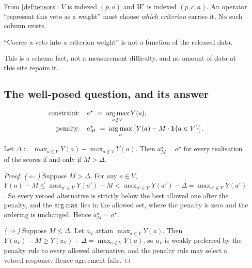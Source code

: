 From \cref{def:tensors}: $V$ is indexed $(p,a)$ and $W$ is indexed $(p,c,a)$.
An operator ``represent this veto as a weight'' must choose \emph{which criterion}
carries it. No such column exists.

\begin{proposition}
``Coerce a veto into a criterion weight'' is not a function of the released data.
\end{proposition}

This is a schema fact, not a measurement difficulty, and no amount of data at
this site repairs it.

\subsection{The well-posed question, and its answer}

\begin{definition}
\begin{align}
\text{constraint:}&\quad a^\star \;=\; \operatorname*{arg\,max}_{a \notin V} Y(a),\\
\text{penalty:}&\quad a^\star_M \;=\; \operatorname*{arg\,max}_{a} \big[Y(a) - M\cdot\mathbf{1}\{a\in V\}\big].
\end{align}
\end{definition}

\begin{theorem}
\label{thm:veto}
Let $\Delta := \max_{a\in V} Y(a) - \max_{a\notin V} Y(a)$. Then
$a^\star_M = a^\star$ for every realisation of the scores if and only if
$M > \Delta$.
\end{theorem}
\begin{proof}
\emph{($\Leftarrow$)} Suppose $M > \Delta$. For any $a \in V$,
$Y(a) - M \le \max_{a'\in V}Y(a') - M < \max_{a'\in V}Y(a') - \Delta
= \max_{a'\notin V}Y(a')$. So every vetoed alternative is strictly below the best
allowed one after the penalty, and the $\operatorname*{arg\,max}$ lies in the allowed set, where
the penalty is zero and the ordering is unchanged. Hence $a^\star_M = a^\star$.

\emph{($\Rightarrow$)} Suppose $M \le \Delta$. Let $a_V$ attain
$\max_{a\in V}Y(a)$. Then
$Y(a_V) - M \ge Y(a_V) - \Delta = \max_{a\notin V}Y(a)$, so $a_V$ is weakly
preferred by the penalty rule to every allowed alternative, and the penalty rule
may select a vetoed response. Hence agreement fails.
\end{proof}


